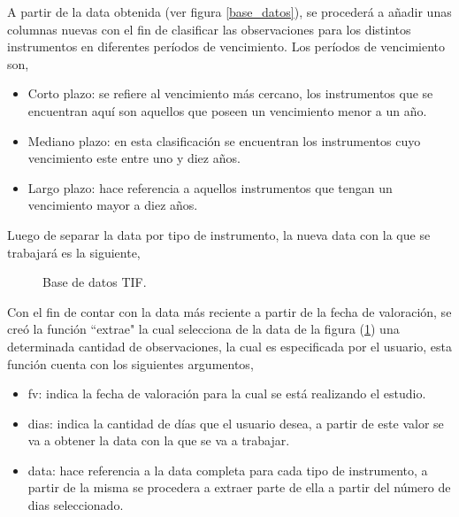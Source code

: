 \hspace{0.4cm} A partir de la data obtenida (ver figura \ref{base_datos}), se proceder\'a a a\~nadir unas columnas nuevas con el fin de clasificar las observaciones para los distintos instrumentos en diferentes per\'iodos de vencimiento. Los per\'iodos de vencimiento son,

\begin{itemize}
\item Corto plazo: se refiere al vencimiento m\'as cercano, los instrumentos que se encuentran aqu\'i son aquellos que poseen un vencimiento menor a un a\~no.
\item Mediano plazo: en esta clasificaci\'on se encuentran los instrumentos cuyo vencimiento este entre uno y diez a\~nos.
\item Largo plazo: hace referencia a aquellos instrumentos que tengan un vencimiento mayor a diez a\~nos.
\end{itemize}

\hspace{0.4cm} Luego de separar la data por tipo de instrumento, la nueva data con la que se trabajar\'a es la siguiente,

\begin{figure}[h]
\caption{Base de datos TIF.}
\label{base_datos_tif}
\end{figure}

\hspace{0.4cm} Con el fin de contar con la data m\'as reciente a partir de la fecha de valoraci\'on, se cre\'o la funci\'on ``extrae" la cual selecciona de la data de la figura (\ref{base_datos_tif}) una determinada cantidad de observaciones, la cual es especificada por el usuario, esta funci\'on cuenta con los siguientes argumentos,

\begin{itemize}
 \item fv: indica la fecha de valoraci\'on para la cual se est\'a realizando el estudio.
 \item dias: indica la cantidad de d\'ias que el usuario desea, a partir de este valor se va a obtener la data con la que se va a trabajar.
 \item data: hace referencia a la data completa para cada tipo de instrumento, a partir de la misma se procedera a extraer parte de ella a partir del n\'umero de dias seleccionado.
\end{itemize}

